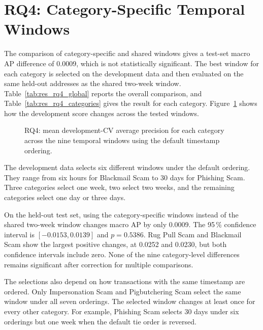 \section{RQ4: Category-Specific Temporal Windows}

The comparison of category-specific and shared windows gives a test-set macro
AP difference of 0.0009, which is not statistically significant. The best
window for each category is selected on the development data and then evaluated
on the same held-out addresses as the shared two-week window.
Table~\ref{tab:res_rq4_global} reports the overall comparison, and
Table~\ref{tab:res_rq4_categories} gives the result for each category.
Figure~\ref{fig:res_rq4} shows how the development score changes across the
tested windows.

\begin{figure}[ht]
  \centering
  \caption{RQ4: mean development-CV average precision for each category across
  the nine temporal windows using the default timestamp ordering.}
  \label{fig:res_rq4}
\end{figure}


The development data selects six different windows under the default ordering.
They range from six hours for Blackmail Scam to 30 days for Phishing Scam. Three
categories select one week, two select two weeks, and the remaining categories
select one day or three days.

On the held-out test set, using the category-specific windows instead of the
shared two-week window changes macro AP by only 0.0009. The 95\,\% confidence
interval is $[-0.0153,0.0139]$ and $p=0.5386$. Rug Pull Scam and Blackmail Scam
show the largest positive changes, at 0.0252 and 0.0230, but both confidence
intervals include zero. None of the nine category-level differences remains
significant after correction for multiple comparisons.

The selections also depend on how transactions with the same timestamp are
ordered. Only Impersonation Scam and Pigbutchering Scam select the same window
under all seven orderings. The selected window changes at least once for every
other category. For example, Phishing Scam selects 30 days under six orderings
but one week when the default tie order is reversed.

